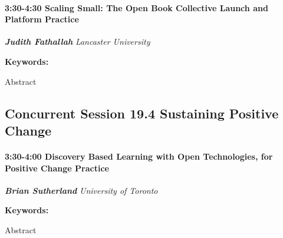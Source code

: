 \documentclass[
]{book}
\begin{document}
\begin{session}
\hypertarget{scaling-small-the-open-book-collective-launch-and-platform-practice}{%
\paragraph*{\texorpdfstring{3:30-4:30 \textbar{} \textbf{Scaling Small:
The Open Book Collective Launch and Platform} \textbar{}
Practice}{3:30-4:30 \textbar{} Scaling Small: The Open Book Collective Launch and Platform \textbar{} Practice}}\label{scaling-small-the-open-book-collective-launch-and-platform-practice}}

\textbf{\emph{Judith Fathallah}} \textbar{} \emph{Lancaster University}

\textbf{Keywords:}

Abstract
\end{session}

\hypertarget{concurrent-session-19.4-sustaining-positive-change}{%
\subsection*{Concurrent Session 19.4 \textbar{} Sustaining Positive Change}\label{concurrent-session-19.4-sustaining-positive-change}}

\begin{session}
\hypertarget{discovery-based-learning-with-open-technologies-for-positive-change-practice}{%
\paragraph*{\texorpdfstring{3:30-4:00 \textbar{} \textbf{Discovery Based
Learning with Open Technologies, for Positive Change} \textbar{}
Practice}{3:30-4:00 \textbar{} Discovery Based Learning with Open Technologies, for Positive Change \textbar{} Practice}}\label{discovery-based-learning-with-open-technologies-for-positive-change-practice}}

\textbf{\emph{Brian Sutherland}} \textbar{} \emph{University of Toronto}

\textbf{Keywords:}

Abstract
\end{session}
\end{document}
